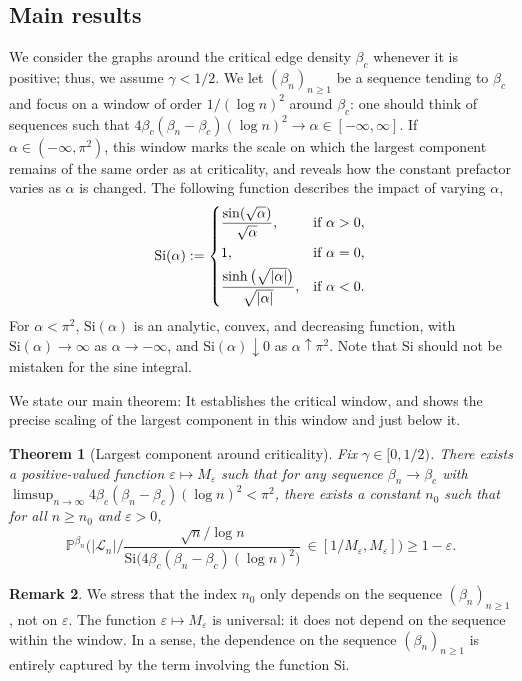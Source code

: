 \documentclass[a4paper, a4wide, 10pt, reqno]{amsart}
\theoremstyle{plain}
\newtheorem{theorem}{Theorem}[section]
\theoremstyle{definition}
\newtheorem{remark}[theorem]{Remark}
\numberwithin{equation}{section}
\newcommand{\Prob}{\mathbb{P}}
\newcommand{\sL}{{\mathscr L}}
\newcommand{\Si}{{\mathrm{Si}}}
\begin{document}
\subsection{Main results}
We consider the graphs around the critical edge density $\beta_c$ whenever it is positive; thus, we assume $\gamma<1/2$. We let $(\beta_n)_{n\ge 1}$ be a sequence tending to $\beta_c$ and focus on a window of order $1/(\log n)^2$ around $\beta_c$: one should think of sequences such that $4\beta_c(\beta_n-\beta_c)(\log n)^2\to\alpha\in[-\infty, \infty]$. If
$\alpha\in(-\infty,\pi^2)$, this window marks the scale on which the largest component remains of the same order as at criticality, and reveals how the constant prefactor varies as $\alpha$ is changed. 
The following function describes the impact of varying $\alpha$, 
\begin{equation}\label{eq:CS}
    \Si(\alpha):=\begin{dcases}
        \frac{\sin(\sqrt{\alpha})}{\sqrt{\alpha}},&\text{if }\alpha>0,\\
        1,&\text{if }\alpha = 0,\\
        \frac{\sinh\big(\sqrt{|\alpha|}\big)}{\sqrt{|\alpha|}},&\text{if }\alpha<0.
    \end{dcases}
\end{equation}
For $\alpha<\pi^2$, $ \Si(\alpha)$ is an analytic, convex, and decreasing function, with $\Si(\alpha)\to\infty$ as $\alpha\to-\infty$, and $\Si(\alpha)\downarrow 0$ as $\alpha\uparrow\pi^2$. Note that $\Si$ should not be mistaken for the sine integral.

\smallskip
We state our main theorem: It establishes the critical window, and shows the precise scaling of the largest component in this window and just below it.  
\begin{theorem}[Largest component around criticality]\label{thm:largest}
	Fix $\gamma\in[0, 1/2)$. There exists a positive-valued function $\varepsilon\mapsto M_\varepsilon$ such that for any sequence $\beta_n\to\beta_c$ with $\limsup_{n\to\infty}4\beta_c(\beta_{n}-\beta_c)(\log n)^2<\pi^2$, there exists a constant $n_0$ such that for all $n\ge n_0$ and $\varepsilon>0$,
     \[
     \Prob^{\beta_n}\bigg(\big|\sL_n\big|\Big/ \frac{\sqrt n/\log n}{\Si\big(4\beta_c(\beta_{n}-\beta_c)(\log n)^2\big)}\, \in [1/M_\varepsilon, M_\varepsilon]\bigg) \ge 1-\varepsilon.
     \]
\end{theorem}

\begin{remark} 
    We stress that the index $n_0$ only depends on the sequence $(\beta_n)_{n\ge 1}$, not on $\varepsilon$. The function $\varepsilon\mapsto M_\varepsilon$ is universal: it does not depend on the sequence within the window. In a sense, the dependence on the sequence $(\beta_n)_{n\ge1}$ is entirely captured by the term involving the function $\Si$. 
\label{rem:onmaintheo}
\end{remark}
\end{document}
